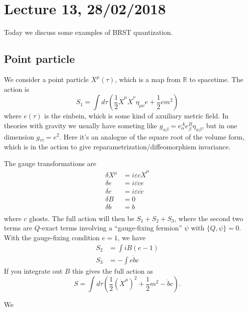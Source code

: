 \section*{Lecture 13, 28/02/2018}
Today we discuss some examples of BRST quantization.

\subsection*{Point particle}
We consider a point particle $X^\mu(\tau)$, which is a map from $\mathbb R$ to spacetime.
The action is
\[
S_1 = \int d\tau \left (\frac{1}{2} \dot X^\mu \dot X^\nu \eta_{\mu \nu} e + \frac{1}{2} e m^2 \right)
\]
where $e(\tau)$ is the einbein, which is some kind of axuiliary metric field.
In theories with gravity we usually have someting like $g_{\alpha \beta} = e^A_\alpha e^B_\beta \eta_{\alpha \beta}$, but in one dimension $g_{\tau \tau} = e^2$.
Here it's an analogue of the square root of the volume form, which is in the action to give reparametrization/diffeomorphism invariance.

The gauge transformations are
\begin{align*}
\delta X^\mu &= i \varepsilon c \dot X^\mu\\
\delta e &= i \varepsilon \dot c e\\
\delta c &= i \varepsilon c \dot c\\
\delta B &= 0\\
\delta b &= b\\
\end{align*}
where $c$  ghosts.
The full action will then be $S_1 + S_2 + S_3$, where the second two terms are $Q$-exact terms involving a ``gauge-fixing fermion'' $\psi$ with $\{ Q, \psi\}  = 0$.
With the gauge-fixing condition $e = 1$, we have
\begin{align*}
S_2 &= \int i B(e-1)\\
S_3 &= -\int e \dot bc
\end{align*}
If you integrate out $B$ this gives the full action as
\[
S = \int d \tau \left( \frac{1}{2} (\dot X^\mu)^2 + \frac{1}{2} m^2 - \dot b c \right).
\]

We 


